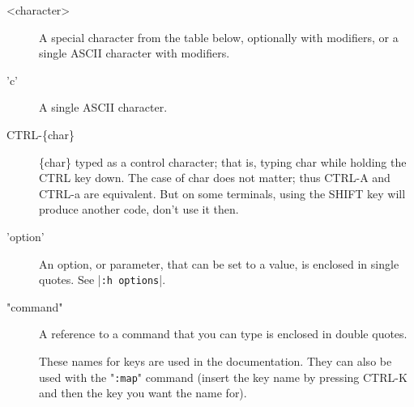 \begin{description}
				\item[<character>]
								\label{<character>}
								A special character from the table below, optionally with modifiers, or a single ASCII character with modifiers.

				\item['c']
								\label{'character'}
								A single ASCII character.

				\item[CTRL-\{char\}]
								\label{CTRL-{char}}
								\{char\} typed as a control character; that is, typing {char} while holding the CTRL key down.
								The case of {char} does not matter; thus CTRL-A and CTRL-a are equivalent.
								But on some terminals, using the SHIFT key will produce another code, don't use it then.

				\item['option']
								\label{'option'}
								An option, or parameter, that can be set to a value, is enclosed in single quotes.
								See |\verb!:h options!|.

				\item["command"]
								\label{quotecommandquote}
								A reference to a command that you can type is enclosed in double quotes.

				\item[]
								\label{key-notation}
								\label{key-codes}
								\label{keycodes}
These names for keys are used in the documentation.
They can also be used with the "\verb!:map!" command (insert the key name by pressing CTRL-K and then the key you want the name for).


\end{description}
